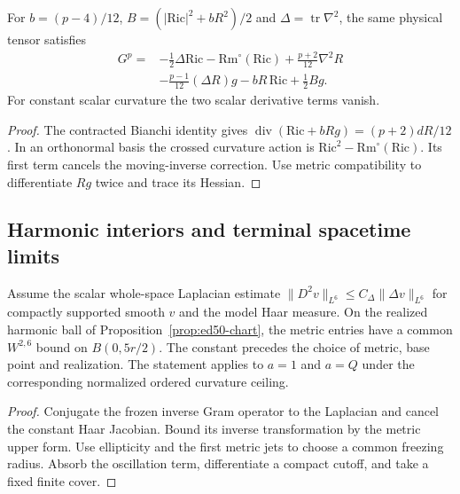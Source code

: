 \begin{proposition}
\label{prop:ed50-commuted}
\leanok
For $b=(p-4)/12$, $B=(|\mathrm{Ric}|^2+bR^2)/2$ and
$\Delta=\operatorname{tr}\nabla^2$, the same physical tensor satisfies
\[
\begin{aligned}
G^p={}&-\tfrac12\Delta\mathrm{Ric}-\mathrm{Rm}^{\circ}(\mathrm{Ric})
       +\tfrac{p+2}{12}\nabla^2R\\
     &-\tfrac{p-1}{12}(\Delta R)g-bR\,\mathrm{Ric}+\tfrac12Bg .
\end{aligned}
\]
For constant scalar curvature the two scalar derivative terms vanish.
\end{proposition}
\begin{proof}
\leanok
The contracted Bianchi identity gives
$\operatorname{div}(\mathrm{Ric}+bRg)=(p+2)dR/12$.
In an orthonormal basis the crossed curvature action is
$\mathrm{Ric}^2-\mathrm{Rm}^{\circ}(\mathrm{Ric})$.
Its first term cancels the moving-inverse correction. Use metric
compatibility to differentiate $Rg$ twice and trace its Hessian.
\end{proof}

\subsection{Harmonic interiors and terminal spacetime limits}

\begin{proposition}
\label{prop:ed51-metric}
\leanok
Assume the scalar whole-space Laplacian estimate
$\|D^2v\|_{L^6}\le C_\Delta\|\Delta v\|_{L^6}$ for compactly supported smooth
$v$ and the model Haar measure. On the realized harmonic ball of
Proposition~\ref{prop:ed50-chart}, the metric entries have a common
$W^{2,6}$ bound on $B(0,5r/2)$. The constant precedes the choice of
metric, base point and realization. The statement applies to $a=1$
and $a=Q$ under the corresponding normalized ordered curvature ceiling.
\end{proposition}
\begin{proof}
\leanok
Conjugate the frozen inverse Gram operator to the Laplacian and cancel the constant
Haar Jacobian. Bound its inverse transformation by the metric upper form.
Use ellipticity and the first metric jets to choose a common freezing radius.
Absorb the oscillation term, differentiate a compact cutoff, and take a fixed finite cover.
\end{proof}

